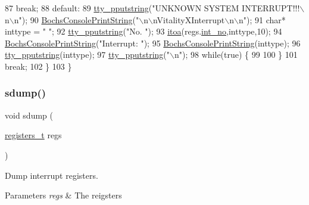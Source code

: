 \begin{DoxyCode}
87             \textcolor{keywordflow}{break};
88         \textcolor{keywordflow}{default}:
89             \hyperlink{a00173_ade960b1320324706aac6c00cc6b1b2fe_ade960b1320324706aac6c00cc6b1b2fe}{tty\_pputstring}(\textcolor{stringliteral}{"UNKNOWN SYSTEM INTERRUPT!!!\(\backslash\)n\(\backslash\)n"});
90             \hyperlink{a00071_a19e1f554d03c977f8b947f21489daa41_a19e1f554d03c977f8b947f21489daa41}{BochsConsolePrintString}(\textcolor{stringliteral}{"\(\backslash\)n\(\backslash\)nVitalityXInterrupt\(\backslash\)n\(\backslash\)n"});
91             \textcolor{keywordtype}{char}* inttype = \textcolor{stringliteral}{"  "};
92             \hyperlink{a00173_ade960b1320324706aac6c00cc6b1b2fe_ade960b1320324706aac6c00cc6b1b2fe}{tty\_pputstring}(\textcolor{stringliteral}{"No. "});
93             \hyperlink{a00119_ab42640268f26e065efd044cfe80591bd_ab42640268f26e065efd044cfe80591bd}{itoa}(regs.\hyperlink{a00254_af311750a9b18afb3b1ed2d144fbe1cb0_af311750a9b18afb3b1ed2d144fbe1cb0}{int\_no},inttype,10);
94             \hyperlink{a00071_a19e1f554d03c977f8b947f21489daa41_a19e1f554d03c977f8b947f21489daa41}{BochsConsolePrintString}(\textcolor{stringliteral}{"Interrupt: "});
95             \hyperlink{a00071_a19e1f554d03c977f8b947f21489daa41_a19e1f554d03c977f8b947f21489daa41}{BochsConsolePrintString}(inttype);
96             \hyperlink{a00173_ade960b1320324706aac6c00cc6b1b2fe_ade960b1320324706aac6c00cc6b1b2fe}{tty\_pputstring}(inttype);
97             \hyperlink{a00173_ade960b1320324706aac6c00cc6b1b2fe_ade960b1320324706aac6c00cc6b1b2fe}{tty\_pputstring}(\textcolor{stringliteral}{"\(\backslash\)n"});
98             \textcolor{keywordflow}{while}(\textcolor{keyword}{true}) \{
99 
100             \}
101             \textcolor{keywordflow}{break};
102     \}
103 \}
\end{DoxyCode}
\mbox{\label{a00110_a4b4233daef6e041e7278cae2b21b5ed4_a4b4233daef6e041e7278cae2b21b5ed4}} 
\subsubsection{\texorpdfstring{sdump()}{sdump()}}
{\footnotesize\ttfamily void sdump (\begin{DoxyParamCaption}\item[{\hyperlink{a00134_adf58dbaf6139b4957c348711f2026957_adf58dbaf6139b4957c348711f2026957}{registers\+\_\+t}}]{regs }\end{DoxyParamCaption})}



Dump interrupt registers. 


\begin{DoxyParams}{Parameters}
{\em regs} & The reigsters \\
\hline
\end{DoxyParams}
